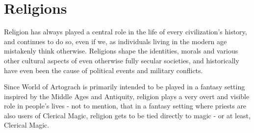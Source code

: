 \section{Religions}
Religion has always played a central role in the life of every civilization's history, and continues to do so, even if we, as individuals living in the modern age mistakenly think otherwise. Religions shape the identities, morals and various other cultural aspects of even otherwise fully secular societies, and historically have even been the cause of political events and military conflicts.

Since World of Artograch is primarily intended to be played in a fantasy setting inspired by the Middle Ages and Antiquity, religion plays a very overt and visible role in people's lives - not to mention, that in a fantasy setting where priests are also users of Clerical Magic, religion gets to be tied directly to magic - or at least, Clerical Magic.

